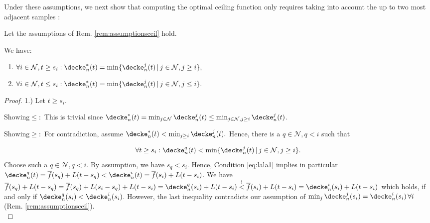 Under these assumptions, we next show that computing the optimal ceiling function only requires taking into account the up to two most adjacent samples :

\begin{lem}\label{lem:shieldingsamples_1d}
Let the assumptions of Rem. \ref{rem:assumptionsceil} hold.

We have:

\begin{enumerate}
\item $\forall i \in \mathcal N, t \geq s_i: \decke_n^* ( t) =\min\{  \decke_n^j (t) \,\vert \, j \in \mathcal N, j \geq i\}, $	
\item $\forall i \in \mathcal N, t \leq s_i: \decke_n^* ( t) =\min\{  \decke_n^j (t) \,\vert \, j \in \mathcal N,j \leq i\}.$ 
\end{enumerate}

\begin{proof}
1.) Let $t \geq s_i$. 

$\text{Showing} \leq:$ This is trivial since $\decke_n^*(t) = \min_{j \in \mathcal N} \decke_n^j(t) \leq \min_{j \in \mathcal N, j \geq i}\decke_n^j(t)$. 


$\text{Showing} \geq:$ For contradiction, assume $\decke_n^* ( t) < \min_{j\geq i} \decke_n^j(t).$ 
Hence, there is a $q \in \mathcal N, q < i$ such that 

\begin{equation}
\label{eq:lala1}
\forall t \geq s_i: \decke_n^q(t) < \min\{  \decke_n^j (t) \,\vert \, j \in \mathcal N, j \geq i\}.
\end{equation}
%
Choose such a $q \in \mathcal N, q < i$.
By assumption, we have $s_q < s_i$. Hence, Condition \ref{eq:lala1} implies in particular $\decke_n^q(t) = \overline f(s_q) + L (t - s_q) < \decke_n^i(t) = \overline f(s_i) + L (t - s_i)$. We have $\overline f(s_q) + L (t - s_q) = \overline f(s_q) + L (s_i - s_q) + L (t - s_i) = \decke_n^q(s_i) + L (t-s_i) \stackrel{!}{ <} \overline f(s_i) + L (t-s_i)=\decke_n^i(s_i) + L (t-s_i) $ which holds, if and only if $\decke_n^q(s_i) < \decke_n^i(s_i)$. However, the last inequality contradicts our assumption of $\min_j \decke_n^j(s_i) =\decke_n^i(s_i)\,\forall i$ (Rem. \ref{rem:assumptionsceil}).\\


\end{proof}
\end{lem}
